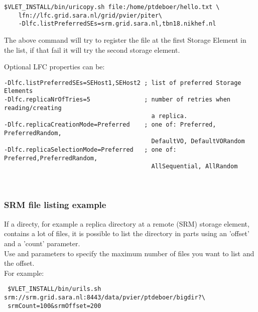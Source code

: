 \hspace*{10mm}\begin{minipage}{170mm}
\begin{verbatim}
$VLET_INSTALL/bin/uricopy.sh file:/home/ptdeboer/hello.txt \
	lfn://lfc.grid.sara.nl/grid/pvier/piter\
	-Dlfc.listPreferredSEs=srm.grid.sara.nl,tbn18.nikhef.nl
\end{verbatim}
\end{minipage}

The above command will try to register the file at the first Storage Element in
the list, if that fail it will try the second storage element. 

Optional LFC properties can be: \\

\hspace*{10mm}\begin{minipage}{170mm}
\begin{verbatim}
-Dlfc.listPreferredSEs=SEHost1,SEHost2 ; list of preferred Storage Elements
-Dlfc.replicaNrOfTries=5               ; number of retries when reading/creating
                                         a replica. 
-Dlfc.replicaCreationMode=Preferred    ; one of: Preferred, PreferredRandom,
                                         DefaultVO, DefaultVORandom 
-Dlfc.replicaSelectionMode=Preferred   ; one of: Preferred,PreferredRandom,
                                         AllSequential, AllRandom
\end{verbatim}
\end{minipage}\\


\subsubsection{SRM file listing example}
     
If a directy, for example a replica directory at a remote (SRM) storage element,
contains a lot of files, it is possible to list the directory in parts using an
'offset' and a 'count' parameter. \\
Use  \Path{srmCount} and \Path{srmOffset} parameters to specify the maximum
number of files you want to list and the offset. \\
For example:  

\hspace*{10mm}\begin{minipage}{170mm}
\begin{verbatim} $VLET_INSTALL/bin/urils.sh srm://srm.grid.sara.nl:8443/data/pvier/ptdeboer/bigdir?\
 srmCount=100&srmOffset=200
\end{verbatim}
\end{minipage}



